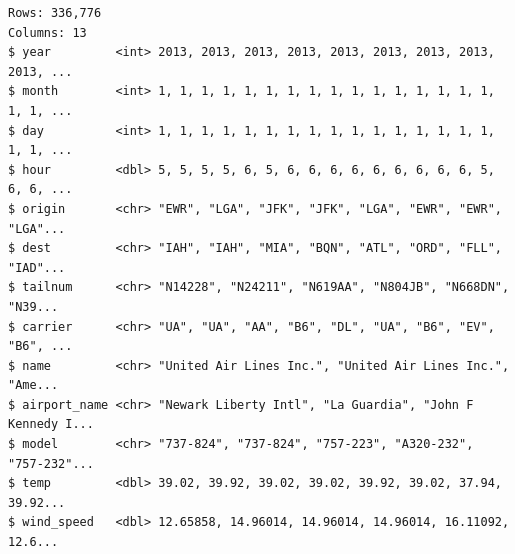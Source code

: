 \documentclass[
  11pt,
]{krantz}
\newenvironment{Shaded}{\begin{snugshade}}{\end{snugshade}}
\newcommand{\CommentTok}[1]{\textcolor[rgb]{0.37,0.37,0.37}{\textit{#1}}}
\newcommand{\DataTypeTok}[1]{\textcolor[rgb]{0.27,0.27,0.27}{#1}}
\newcommand{\KeywordTok}[1]{\textcolor[rgb]{0.27,0.27,0.27}{\textbf{#1}}}
\newcommand{\NormalTok}[1]{#1}
\newcommand{\OperatorTok}[1]{\textcolor[rgb]{0.43,0.43,0.43}{\textbf{#1}}}
\newcommand{\StringTok}[1]{\textcolor[rgb]{0.5,0.5,0.5}{#1}}
\begin{document}
\begin{Shaded}
\end{Shaded}

\begin{verbatim}
Rows: 336,776
Columns: 13
$ year         <int> 2013, 2013, 2013, 2013, 2013, 2013, 2013, 2013, 2013, ...
$ month        <int> 1, 1, 1, 1, 1, 1, 1, 1, 1, 1, 1, 1, 1, 1, 1, 1, 1, 1, ...
$ day          <int> 1, 1, 1, 1, 1, 1, 1, 1, 1, 1, 1, 1, 1, 1, 1, 1, 1, 1, ...
$ hour         <dbl> 5, 5, 5, 5, 6, 5, 6, 6, 6, 6, 6, 6, 6, 6, 6, 5, 6, 6, ...
$ origin       <chr> "EWR", "LGA", "JFK", "JFK", "LGA", "EWR", "EWR", "LGA"...
$ dest         <chr> "IAH", "IAH", "MIA", "BQN", "ATL", "ORD", "FLL", "IAD"...
$ tailnum      <chr> "N14228", "N24211", "N619AA", "N804JB", "N668DN", "N39...
$ carrier      <chr> "UA", "UA", "AA", "B6", "DL", "UA", "B6", "EV", "B6", ...
$ name         <chr> "United Air Lines Inc.", "United Air Lines Inc.", "Ame...
$ airport_name <chr> "Newark Liberty Intl", "La Guardia", "John F Kennedy I...
$ model        <chr> "737-824", "737-824", "757-223", "A320-232", "757-232"...
$ temp         <dbl> 39.02, 39.92, 39.02, 39.02, 39.92, 39.02, 37.94, 39.92...
$ wind_speed   <dbl> 12.65858, 14.96014, 14.96014, 14.96014, 16.11092, 12.6...
\end{verbatim}
\end{document}
